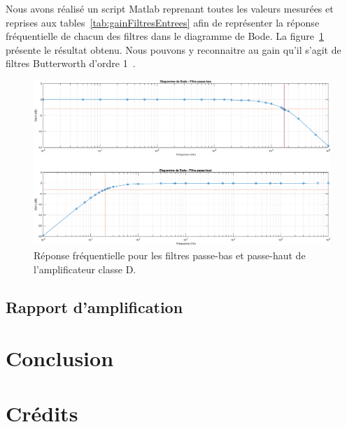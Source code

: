 \documentclass[10pt, oneside, a4paper]{article}
\begin{document}
Nous avons réalisé un script Matlab\textregistered{} reprenant toutes les valeurs mesurées et reprises aux tables~\ref{tab:gainFiltresEntrees} afin de représenter la réponse fréquentielle de chacun des filtres dans le diagramme de Bode.
La figure~\ref{fig:resultatRepFreq} présente le résultat obtenu.
Nous pouvons y reconnaitre au gain qu'il s'agit de filtres Butterworth d'ordre 1~\cite{Horowitz:2015aa}.
\begin{figure}[!ht]
    \centering
    \includegraphics[width=\textwidth]{eps/bode-filtres.eps}
    \caption{Réponse fréquentielle pour les filtres passe-bas
             et passe-haut de l'amplificateur classe D.}
    \label{fig:resultatRepFreq}
\end{figure}

\subsection{Rapport d'amplification}

\section{Conclusion}


\section*{Crédits}
    
\end{document}
